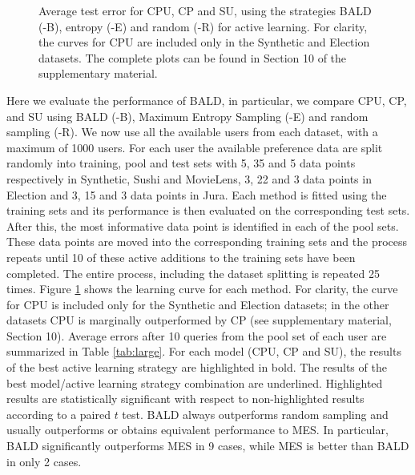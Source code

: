 \begin{figure}[h!]
{\begin{tabular}{ccc}
\end{tabular}
}
\caption{Average test error for CPU, CP and SU, using the strategies BALD (-B), entropy (-E) and random (-R) for active learning.
For clarity, the curves for CPU are included only in the Synthetic and Election datasets.
The complete plots can be found in Section 10 of the supplementary material.\label{fig:learningcurves}}
\end{figure}

Here we evaluate the performance of BALD,
in particular, we compare CPU, CP, and SU using BALD (-B), Maximum Entropy Sampling (-E) and random sampling (-R).
We now use all the available users from each dataset, with a maximum of 1000 users.
For each user the available preference data are
split randomly into training, pool and test sets with 5, 35 and 5 data points respectively
in Synthetic, Sushi and MovieLens, 3, 22 and 3 data points in Election
and 3, 15 and 3 data points in Jura.
Each method is fitted using the training sets and its performance
is then evaluated on the corresponding test sets. After this,
the most informative data point is identified in each
of the pool sets. These data points are moved into the corresponding training sets
and the process repeats until 10 of these active
additions to the training sets have been completed.
The entire process, including the dataset splitting is repeated 25 times. 
Figure \ref{fig:learningcurves} shows the learning curve for each method.
For clarity, the curve for CPU is included only for the Synthetic and Election datasets; in the other datasets CPU is marginally outperformed by CP (see supplementary material, Section 10).
Average errors after 10 queries from the pool set of each user are summarized in Table \ref{tab:large}.
For each model (CPU, CP and SU), the results of the best active learning strategy are highlighted in bold.
The results of the best model/active learning strategy combination are underlined.
Highlighted results are statistically significant with respect to non-highlighted
results according to a paired $t$ test.
BALD always outperforms random sampling and usually outperforms or obtains equivalent performance to MES. 
In particular, BALD significantly outperforms MES in 9 cases,
while MES is better than BALD in only 2 cases.
